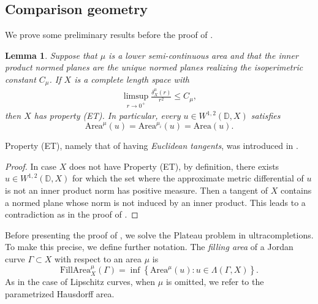 \documentclass[a4paper,leqno]{amsart}
\numberwithin{equation}{section}
\newtheorem{lemma}[theorem]{Lemma}
\theoremstyle{remark}
\theoremstyle{remark}
\begin{document}
\subsection{Comparison geometry}\label{section-comparison-geometry}
We prove some preliminary results before the proof of .
\begin{lemma}\label{lemma-property-ET}
Suppose that $\mu$ is a lower semi-continuous area and that the inner product normed planes are the unique normed planes realizing the isoperimetric constant $C_\mu$. If $X$ is a complete length space with
\begin{align}\label{equation-asymptotic-dehn-function}
    \limsup_{ r \rightarrow 0^{+} } \frac{ \delta_{X}^{\mu}(r) }{ r^2 } \leq C_\mu,
\end{align}
then $X$ has property (ET). In particular, every $u \in W^{1,2}( \mathbb{D}, X )$ satisfies $$\mathrm{Area}^{\mu}(u) = \mathrm{Area}^{\mu_i}(u) = \mathrm{Area}(u).$$
\end{lemma}
Property (ET), namely that of having \emph{Euclidean tangents}, was introduced in \cite{Lyt:Wen:17:areamini}.
\begin{proof}
    In case $X$ does not have Property (ET), by definition, there exists $u \in W^{1,2}( \mathbb{D}, X )$ for which the set where the approximate metric differential of $u$ is not an inner product norm has positive measure. Then a tangent of $X$ contains a normed plane whose norm is not induced by an inner product. This leads to a contradiction as in the proof of .
%    
\end{proof}





Before presenting the proof of , we solve the Plateau problem in ultracompletions. To make this precise, we define further notation. The \emph{filling area} of a Jordan curve $\Gamma \subset X$ with respect to an area $\mu$ is
\begin{equation*}%
    \mathrm{FillArea}^{\mu}_{X}( \Gamma )
    =
    \inf\left\{
        \mathrm{Area}^{\mu}(u) \colon u \in \Lambda( \Gamma, X )
    \right\}.
\end{equation*}
As in the case of Lipschitz curves, when $\mu$ is omitted, we refer to the parametrized Hausdorff area.
\end{document}
